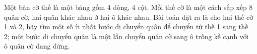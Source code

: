 Một bàn cờ thế là một bảng gồm 4 dòng, 4 cột. Mỗi thế cờ là một cách sắp xếp 8 quân cờ, hai quân khác nhau ở hai ô khác nhau.            Bài toán đặt ra là cho hai thế cờ 1 và 2, hãy tìm một số ít nhất bước di chuyển quân để chuyển từ thế 1 sang thế 2; một bước di chuyển quân là một lần chuyển quân cờ sang ô trống kề cạnh với ô quân cờ đang đứng.  

\